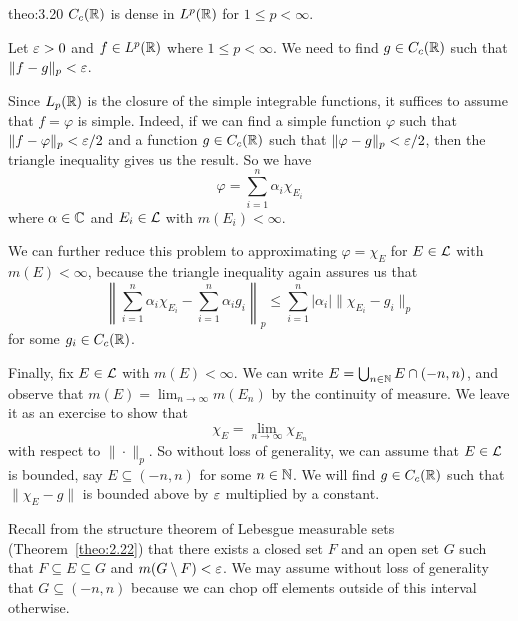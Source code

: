 \begin{theo}{theo:3.20}
    $C_c(\mathbb{R})$ is dense in $L^p(\mathbb{R})$ for $1 \leq p < \infty$. 
\end{theo}
\begin{pf}
    Let $\varepsilon > 0$ and $f \in L^p(\mathbb{R})$ where $1 \leq p < \infty$. We need 
    to find $g \in C_c(\mathbb{R})$ such that $\|f - g\|_p < \varepsilon$. 

    Since $L_p(\mathbb{R})$ is the closure of the simple integrable functions, 
    it suffices to assume that $f = \varphi$ is simple. Indeed, if we 
    can find a simple function $\varphi$ such that $\|f - \varphi\|_p < \varepsilon/2$
    and a function $g \in C_c(\mathbb{R})$ such that $\|\varphi - g\|_p < \varepsilon/2$, 
    then the triangle inequality gives us the result. So we have 
    \[ \varphi = \sum_{i=1}^n \alpha_i \chi_{E_i} \] 
    where $\alpha \in \mathbb{C}$ and $E_i \in {\cal L}$ with $m(E_i) < \infty$. 

    We can further reduce this problem to approximating $\varphi = \chi_E$ 
    for $E \in {\cal L}$ with $m(E) < \infty$, because the triangle inequality 
    again assures us that 
    \[ \left\| \sum_{i=1}^n \alpha_i \chi_{E_i} - \sum_{i=1}^n 
    \alpha_i g_i \right\|_p \leq \sum_{i=1}^n |\alpha_i| \|\chi_{E_i} 
    - g_i\|_p \] 
    for some $g_i \in C_c(\mathbb{R})$. 

    Finally, fix $E \in {\cal L}$ with $m(E) < \infty$. We can write 
    $E = \bigcup_{n\in\mathbb{N}} E \cap (-n, n)$, and observe that 
    $m(E) = \lim_{n\to\infty} m(E_n)$ by the continuity of measure. 
    We leave it as an exercise to show that 
    \[ \chi_E = \lim_{n\to\infty} \chi_{E_n} \] 
    with respect to $\|\cdot\|_p$. So without loss of generality, 
    we can assume that $E \in {\cal L}$ is bounded, say $E \subseteq 
    (-n, n)$ for some $n \in \mathbb{N}$. We will find $g \in C_c(\mathbb{R})$ 
    such that $\|\chi_E - g\|$ is bounded above by $\varepsilon$ multiplied 
    by a constant. 

    Recall from the structure theorem of Lebesgue measurable sets 
    (Theorem~\ref{theo:2.22}) that there exists a closed set $F$ and 
    an open set $G$ such that $F \subseteq E \subseteq G$ and 
    $m(G \setminus F) < \varepsilon$. We may assume without loss of generality 
    that $G \subseteq (-n, n)$ because we can chop off elements outside 
    of this interval otherwise. 


\end{pf}

